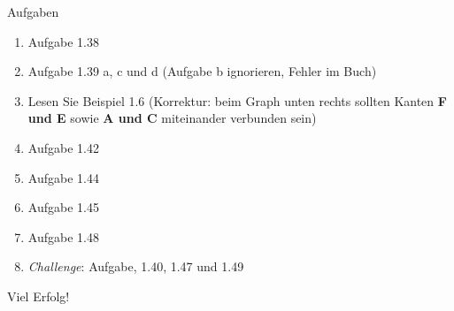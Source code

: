 \begin{frame}[fragile]{Aufgaben}
\begin{enumerate}
    \item Aufgabe 1.38
    \item Aufgabe 1.39 a, c und d (Aufgabe b ignorieren, Fehler im Buch)
    \item Lesen Sie Beispiel 1.6 (Korrektur: beim Graph unten rechts sollten Kanten \textbf{F und E} sowie \textbf{A und C} miteinander verbunden sein)
    \item Aufgabe 1.42
    \item Aufgabe 1.44
    \item Aufgabe 1.45
    \item Aufgabe 1.48
    \item \textit{Challenge}: Aufgabe, 1.40, 1.47 und 1.49
\end{enumerate}
\vfill
\begin{center}
    Viel Erfolg!\\
\end{center}
\end{frame}
